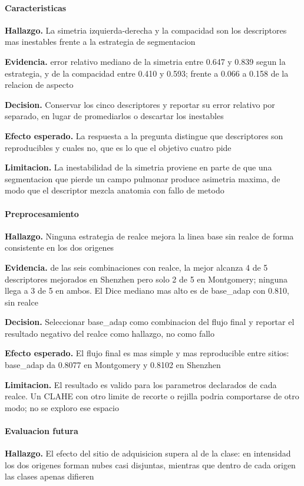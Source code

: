 \paragraph{Caracteristicas}
\textbf{Hallazgo.} La simetria izquierda-derecha y la compacidad son los descriptores mas inestables frente a la estrategia de segmentacion

\textbf{Evidencia.} error relativo mediano de la simetria entre 0.647 y 0.839 segun la estrategia, y de la compacidad entre 0.410 y 0.593; frente a 0.066 a 0.158 de la relacion de aspecto

\textbf{Decision.} Conservar los cinco descriptores y reportar su error relativo por separado, en lugar de promediarlos o descartar los inestables

\textbf{Efecto esperado.} La respuesta a la pregunta distingue que descriptores son reproducibles y cuales no, que es lo que el objetivo cuatro pide

\textbf{Limitacion.} La inestabilidad de la simetria proviene en parte de que una segmentacion que pierde un campo pulmonar produce asimetria maxima, de modo que el descriptor mezcla anatomia con fallo de metodo

\paragraph{Preprocesamiento}
\textbf{Hallazgo.} Ninguna estrategia de realce mejora la linea base sin realce de forma consistente en los dos origenes

\textbf{Evidencia.} de las seis combinaciones con realce, la mejor alcanza 4 de 5 descriptores mejorados en Shenzhen pero solo 2 de 5 en Montgomery; ninguna llega a 3 de 5 en ambos. El Dice mediano mas alto es de base\_adap con 0.810, sin realce

\textbf{Decision.} Seleccionar base\_adap como combinacion del flujo final y reportar el resultado negativo del realce como hallazgo, no como fallo

\textbf{Efecto esperado.} El flujo final es mas simple y mas reproducible entre sitios: base\_adap da 0.8077 en Montgomery y 0.8102 en Shenzhen

\textbf{Limitacion.} El resultado es valido para los parametros declarados de cada realce. Un CLAHE con otro limite de recorte o rejilla podria comportarse de otro modo; no se exploro ese espacio

\paragraph{Evaluacion futura}
\textbf{Hallazgo.} El efecto del sitio de adquisicion supera al de la clase: en intensidad los dos origenes forman nubes casi disjuntas, mientras que dentro de cada origen las clases apenas difieren

